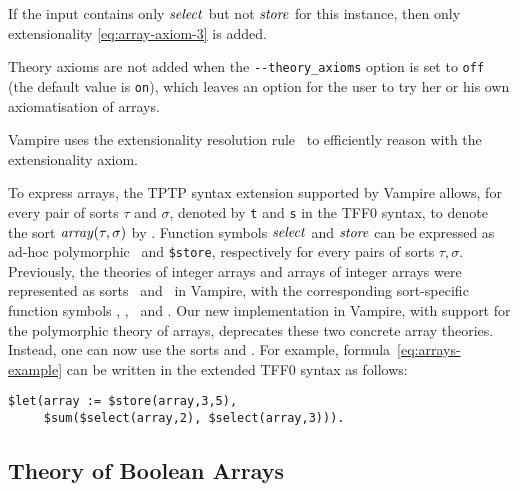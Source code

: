 If the input contains only $\mathit{select}$ but not $\mathit{store}$ for this instance, then only extensionality \eqref{eq:array-axiom-3} is added.

Theory axioms are not added when the \verb'--theory_axioms' option is set to \verb'off' (the default value is \verb'on'), which leaves an option for the user to try her or his own axiomatisation of arrays.

Vampire uses the extensionality resolution rule~\cite{ATVA14} to efficiently reason with the extensionality axiom.

To express arrays, the TPTP syntax extension supported by Vampire
allows, for every pair of sorts $\tau$ and $\sigma$, denoted by
\lstinline't' and \lstinline's' in the TFF0 syntax, to denote the sort
$\mathit{array}(\tau,\sigma)$ by . Function symbols $\mathit{select}$
and $\mathit{store}$ can be expressed as ad-hoc polymorphic \dselect\ and
\texttt{\$store}, respectively for every pairs of sorts
$\tau,\sigma$. Previously,
the theories of integer arrays and arrays of integer arrays were
represented as sorts \darrayone\ and \darraytwo\ in Vampire,
with the corresponding sort-specific function symbols \dselectone, \dselecttwo, \dstoreone\  and
\dstoretwo. Our new implementation in Vampire, with
support for the polymorphic theory of arrays, deprecates these
two concrete array theories. Instead, one can now use the sorts
\darray{\dint}{\dint} and \darray{\dint}{\darray{\dint}{\dint}}.
For example, formula~\eqref{eq:arrays-example} can be written in the extended TFF0 syntax as follows:
\begin{lstlisting}
$let(array := $store(array,3,5),
     $sum($select(array,2), $select(array,3))).
\end{lstlisting}%

\subsection{Theory of Boolean Arrays}

